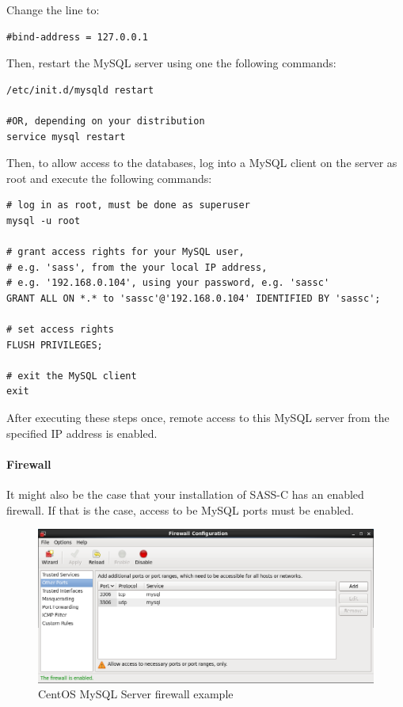 Change the line to:

\begin{lstlisting}
#bind-address = 127.0.0.1
\end{lstlisting}

Then, restart the MySQL server using one the following commands:

\begin{lstlisting}
/etc/init.d/mysqld restart

#OR, depending on your distribution
service mysql restart
\end{lstlisting}

Then, to allow access to the databases, log into a MySQL client on the server as root and execute the following commands:

\begin{lstlisting}
# log in as root, must be done as superuser
mysql -u root

# grant access rights for your MySQL user, 
# e.g. 'sass', from the your local IP address, 
# e.g. '192.168.0.104', using your password, e.g. 'sassc'
GRANT ALL ON *.* to 'sassc'@'192.168.0.104' IDENTIFIED BY 'sassc';

# set access rights
FLUSH PRIVILEGES;

# exit the MySQL client
exit
\end{lstlisting}

After executing these steps once, remote access to this MySQL server from the specified IP address is enabled.

\paragraph{Firewall}

It might also be the case that your installation of SASS-C has an enabled firewall. If that is the case, access to be MySQL ports must be enabled.

\begin{figure}[H]
  \center
    \includegraphics[width=15cm,frame]{figures/centos_firewall.png}
  \caption{CentOS MySQL Server firewall example}
\end{figure}

